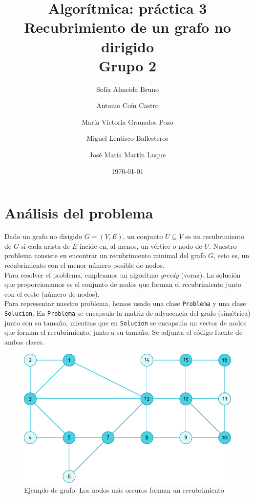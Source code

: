 \documentclass[11pt]{article}
\title{Algorítmica: práctica 3 \\ \large Recubrimiento de un grafo no dirigido\\ \vspace{0.2em}Grupo 2}
\author{Sofía Almeida Bruno \and Antonio Coín Castro \and María Victoria Granados Pozo \and Miguel Lentisco Ballesteros \and José María Martín Luque}
\date{\today}
\begin{document}
\maketitle

\newpage

\section*{Análisis del problema}

Dado un grafo no dirigido $G=(V,E)$, un conjunto $U\subseteq V$ es un recubrimiento de $G$ si cada arista de $E$ incide en, al menos, un vértice o nodo de $U$. Nuestro problema consiste en encontrar un recubrimiento minimal del grafo $G$, esto es, un recubrimiento con el menor número posible de nodos. \\

Para resolver el problema, empleamos un algoritmo \textit{greedy} (voraz). La solución que proporcionamos es el conjunto de nodos que forman el recubrimiento junto con el coste (número de nodos). \\

Para representar nuestro problema, hemos usado una clase \verb|Problema| y una clase \verb|Solucion|. En \verb|Problema| se encapsula la matriz de adyacencia del grafo (simétrica) junto con su tamaño, mientras que en \verb|Solucion| se encapsula un vector de nodos que forman el recubrimiento, junto a su tamaño. Se adjunta el código fuente de ambas clases.\\

\begin{figure}[H]
	\caption{Ejemplo de grafo. Los nodos más oscuros forman un recubrimiento}
	\centering \includegraphics{./img/grafo.pdf}
\end{figure}
\end{document}
